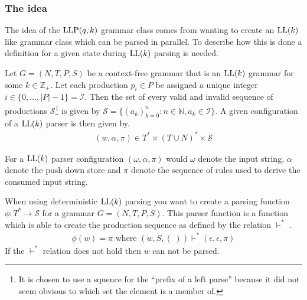 \subsubsection{The idea}
The idea of the $\text{LLP}(q, k)$ grammar class comes from wanting to create an $\text{LL}(k)$ like grammar class which can be parsed in parallel. To describe how this is done a definition for a given state during $\text{LL}(k)$ parsing is needed.
\begin{definition}
    \label{def:configuration}
    Let $G = (N, T, P, S)$ be a context-free grammar that is an $\text{LL}(k)$ grammar for some $k \in \mathbb{Z}_+$. Let each production $p_i \in P$ be assigned a unique integer $i \in \{0, ..., |P| - 1\} = \mathcal{I}$. Then the set of every valid and invalid sequence of productions $\mathcal{S}$\footnote{It is chosen to use a squence for the ``prefix of  a left parse'' \cite[5]{Vagner2007} because it did not seem obvious to which set the element is a member of.} is given by $\mathcal{S} = \{(a_k)_{k=0}^n : n \in \mathbb{N}, a_k \in \mathcal{I}\}$. A given configuration \cite[p. 5]{Vagner2007} of a $\text{LL}(k)$ parser is then given by.
    \begin{align*}
        (w, \alpha, \pi) \in T^* \times (T \cup N)^* \times \mathcal{S}
    \end{align*}
\end{definition}
\noindent For a $\text{LL}(k)$ parser configuration $(\omega, \alpha, \pi)$ would $\omega$ denote the input string, $\alpha$ denote the push down store and $\pi$ denote the sequence of rules used to derive the consumed input string.

When using deterministic $\text{LL}(k)$ parsing you want to create a parsing function $\phi: T^* \to \mathcal{S}$ for a grammar $G = (N, T, P, S)$. This parser function is a function which is able to create the production sequence as defined by the relation $\vdash^*$ \cite[6]{Vagner2007}.
\begin{align*}
    \phi(w) = \pi \text{ where } (w, S, (\;)) \vdash^* (\epsilon, \epsilon, \pi) 
\end{align*}
If the $\vdash^*$ relation does not hold then $w$ can not be parsed. 


